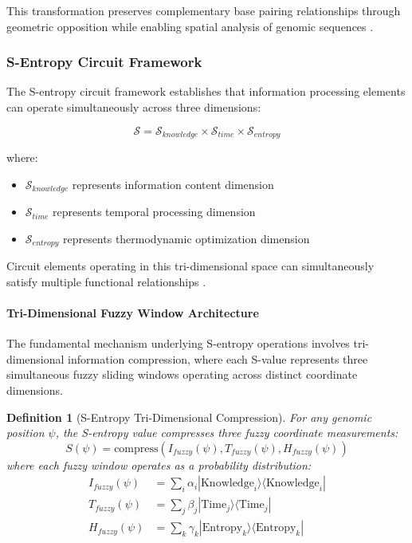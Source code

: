 \documentclass[12pt,a4paper]{article}
\newtheorem{definition}{Definition}
\begin{document}
This transformation preserves complementary base pairing relationships through geometric opposition while enabling spatial analysis of genomic sequences \cite{watson1953molecular}.

\subsubsection{S-Entropy Circuit Framework}

The S-entropy circuit framework \cite{sachikonye2024circuits} establishes that information processing elements can operate simultaneously across three dimensions:

\begin{equation}
\mathcal{S} = \mathcal{S}_{knowledge} \times \mathcal{S}_{time} \times \mathcal{S}_{entropy}
\end{equation}

where:
\begin{itemize}
\item $\mathcal{S}_{knowledge}$ represents information content dimension
\item $\mathcal{S}_{time}$ represents temporal processing dimension  
\item $\mathcal{S}_{entropy}$ represents thermodynamic optimization dimension
\end{itemize}

Circuit elements operating in this tri-dimensional space can simultaneously satisfy multiple functional relationships \cite{shannon1948mathematical, cover2006elements}.

\paragraph{Tri-Dimensional Fuzzy Window Architecture}

The fundamental mechanism underlying S-entropy operations involves tri-dimensional information compression, where each S-value represents three simultaneous fuzzy sliding windows operating across distinct coordinate dimensions.

\begin{definition}[S-Entropy Tri-Dimensional Compression]
For any genomic position $\psi$, the S-entropy value compresses three fuzzy coordinate measurements:
\begin{equation}
S(\psi) = \text{compress}(I_{fuzzy}(\psi), T_{fuzzy}(\psi), H_{fuzzy}(\psi))
\end{equation}
where each fuzzy window operates as a probability distribution:
\begin{align}
I_{fuzzy}(\psi) &= \sum_{i} \alpha_i |\text{Knowledge}_i\rangle \langle\text{Knowledge}_i| \\
T_{fuzzy}(\psi) &= \sum_{j} \beta_j |\text{Time}_j\rangle \langle\text{Time}_j| \\
H_{fuzzy}(\psi) &= \sum_{k} \gamma_k |\text{Entropy}_k\rangle \langle\text{Entropy}_k|
\end{align}
\end{definition}
\end{document}
